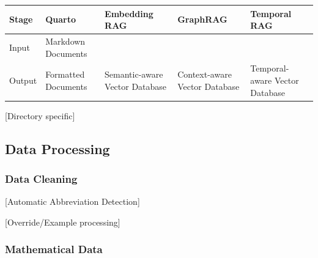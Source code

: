 \documentclass[
  british,
]{article}
\newcounter{none} %
\begin{document}
{\def\LTcaptype{none} %
\begin{longtable}[]{@{}
  >{\raggedright\arraybackslash}p{}
  >{\raggedright\arraybackslash}p{}
  >{\raggedright\arraybackslash}p{}
  >{\raggedright\arraybackslash}p{}
  >{\raggedright\arraybackslash}p{}@{}}
\toprule\noalign{}
\begin{minipage}[b]{\linewidth}\raggedright
Stage
\end{minipage} & \begin{minipage}[b]{\linewidth}\raggedright
Quarto
\end{minipage} & \begin{minipage}[b]{\linewidth}\raggedright
Embedding RAG
\end{minipage} & \begin{minipage}[b]{\linewidth}\raggedright
GraphRAG
\end{minipage} & \begin{minipage}[b]{\linewidth}\raggedright
Temporal RAG
\end{minipage} \\
\midrule\noalign{}
\endhead
\bottomrule\noalign{}
\endlastfoot
Input & Markdown Documents & & & \\
Output & Formatted Documents & Semantic-aware Vector Database &
Context-aware Vector Database & Temporal-aware Vector Database \\
\end{longtable}
}

{[}Directory specific{]}

\subsection{Data Processing}\label{data-processing}

\subsubsection{Data Cleaning}\label{data-cleaning}

{[}Automatic Abbreviation Detection{]}

{[}Override/Example processing{]}

\subsubsection{Mathematical Data}\label{mathematical-data}
\end{document}
